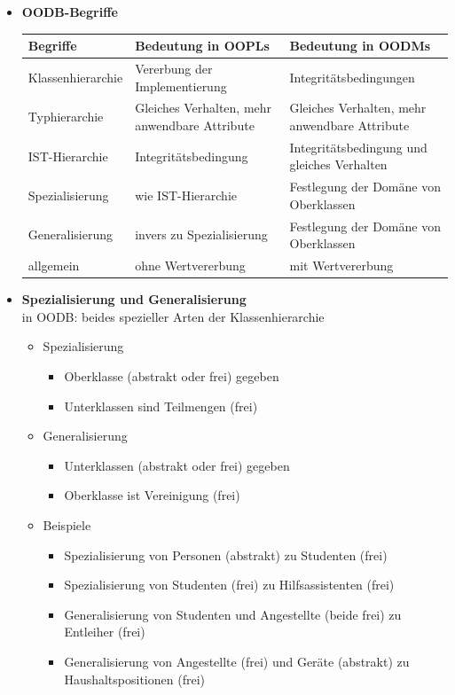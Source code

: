 \begin{itemize}
	\item \textbf{OODB-Begriffe}
	\begin{table}[!h]
		\centering
		\begin{tabular}{|p{10em}|p{15em}|p{15em}|}
			\hline
			Begriffe	& Bedeutung in OOPLs	& Bedeutung in OODMs\\
			\hline
			\hline
			Klassenhierarchie	& Vererbung der Implementierung	& Integritätsbedingungen\\
			\hline
			Typhierarchie	& Gleiches Verhalten, mehr anwendbare Attribute	& Gleiches Verhalten, mehr anwendbare Attribute\\
			\hline
			IST-Hierarchie	& Integritätsbedingung	& Integritätsbedingung und gleiches Verhalten\\
			\hline
			Spezialisierung	& wie IST-Hierarchie	& Festlegung der Domäne von Oberklassen\\
			\hline
			Generalisierung	& invers zu Spezialisierung	& Festlegung der Domäne von Oberklassen\\
			\hline
			\hline
			allgemein	& ohne Wertvererbung	& mit Wertvererbung\\
			\hline
		\end{tabular}
	\end{table}
	
	\item \textbf{Spezialisierung und Generalisierung}\\
	in OODB: beides spezieller Arten der Klassenhierarchie
	\begin{itemize}
		\item Spezialisierung
		\begin{itemize}
			\item Oberklasse (abstrakt oder frei) gegeben
			\item Unterklassen sind Teilmengen (frei)
		\end{itemize}
		
		\item Generalisierung
		\begin{itemize}
			\item Unterklassen (abstrakt oder frei) gegeben
			\item Oberklasse ist Vereinigung (frei)
		\end{itemize}
		
		\item Beispiele
		\begin{itemize}
			\item Spezialisierung von Personen (abstrakt) zu Studenten (frei)
			\item Spezialisierung von Studenten (frei) zu Hilfsassistenten (frei)
			\item Generalisierung von Studenten und Angestellte (beide frei) zu Entleiher (frei)
			\item Generalisierung von Angestellte (frei) und Geräte (abstrakt) zu Haushaltspositionen (frei)
		\end{itemize}
	\end{itemize}
	

\end{itemize}
